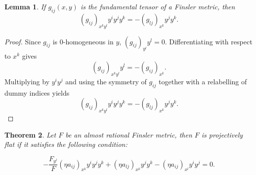 \documentclass[10pt,a4paper]{amsart}
\newtheorem{theorem}{Theorem}[section]
\newtheorem{lemma}[theorem]{Lemma}
\begin{document}
								\begin{lemma}\label{lem1}
									If $g_{ij}(x,y)$ is the fundamental tensor of a Finsler metric, then
									\[
									(g_{ij})_{x^k y^l}y^i y^j y^k
									=
									-(g_{lj})_{x^k}y^j y^k.
									\]
								\end{lemma}
								
								\begin{proof}
									Since $g_{ij}$ is $0$-homogeneous in $y$,
									$(g_{ij})_{y^l}y^l=0.$
									Differentiating with respect to $x^k$ gives
									\[
									(g_{ij})_{x^k y^l}y^l=-(g_{ij})_{x^k}.
									\]
									Multiplying by $y^i y^j$ and using the symmetry of $g_{ij}$ together with a relabelling of dummy indices yields
									\[
									(g_{ij})_{x^k y^l}y^i y^j y^k
									=
									-(g_{lj})_{x^k}y^j y^k.
									\]
								\end{proof}

								\begin{theorem}\label{4.2} Let $F$ be  an almost rational Finsler metric, then $F$ is
									projectively flat 
									if it satisfies the following condition:
									
									\begin{equation}\label{eq:PF_AR_reduced}
									-\frac{F_{y^l}}{F}
									(\eta a_{ij})_{x^k}y^iy^jy^k
									+
									(\eta a_{lj})_{x^k}y^jy^k
									-
									(\eta a_{ij})_{x^l}y^iy^j
									=0.
									\end{equation}
									
								\end{theorem}
\end{document}
